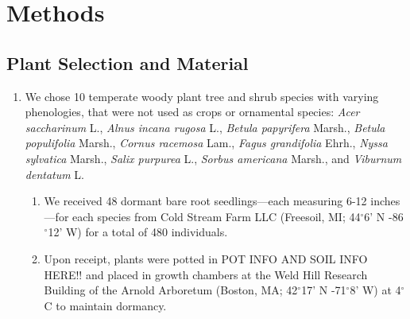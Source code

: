 \documentclass{article}\usepackage[]{graphicx}\usepackage[]{color}
\begin{document}
\section*{Methods}
\subsection*{Plant Selection and Material}
\begin{enumerate}
\item We chose 10 temperate woody plant tree and shrub species with varying phenologies, that were not used as crops or ornamental species: \textit{Acer saccharinum} L., \textit{Alnus incana rugosa} L., \textit{Betula papyrifera} Marsh., \textit{Betula populifolia} Marsh., \textit{Cornus racemosa} Lam., \textit{Fagus grandifolia} Ehrh., \textit{Nyssa sylvatica} Marsh., \textit{Salix purpurea} L., \textit{Sorbus americana} Marsh., and \textit{Viburnum dentatum} L.
  \begin{enumerate}
  \item We received 48 dormant bare root seedlings---each measuring 6-12 inches---for each species from Cold Stream Farm LLC (Freesoil, MI; 44$^{\circ}$6’ N -86$^{\circ}$12’ W) for a total of 480 individuals.
  \item Upon receipt, plants were potted in POT INFO AND SOIL INFO HERE!! and placed in growth chambers at the Weld Hill Research Building of the Arnold Arboretum (Boston, MA; 42$^{\circ}$17’ N -71$^{\circ}$8’ W) at 4$^{\circ}$C to maintain dormancy.
  \end{enumerate}
\end{enumerate}
\end{document}
